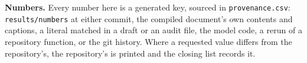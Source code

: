 \noindent\textbf{Numbers.} Every number here is a generated key, sourced in
\texttt{provenance.csv}: \texttt{results/numbers} at either commit, the compiled document's own
contents and captions, a literal matched in a draft or an audit file, the model code, a rerun of
a repository function, or the git history.
Where a requested value differs from the repository's, the repository's is printed and the
closing list records it.
